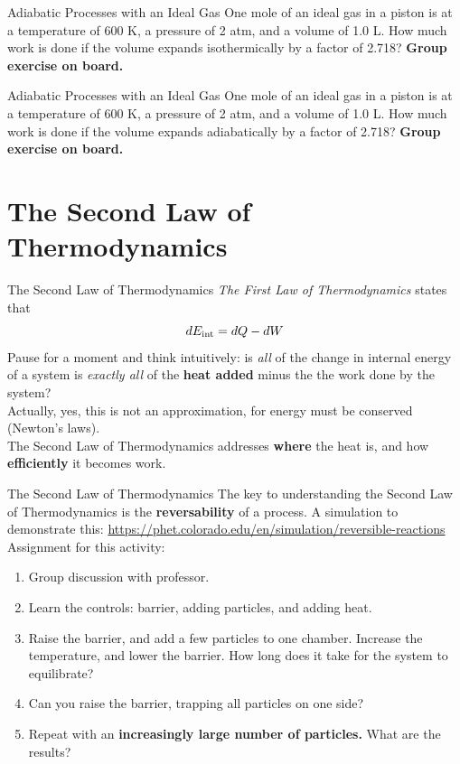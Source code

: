 \documentclass{beamer}
\begin{document}
\begin{frame}{Adiabatic Processes with an Ideal Gas}
One mole of an ideal gas in a piston is at a temperature of 600 K, a pressure of 2 atm, and a volume of 1.0 L.  How much work is done if the volume expands  \alert{isothermically} by a factor of 2.718?
\textbf{Group exercise on board.}
\end{frame}

\begin{frame}{Adiabatic Processes with an Ideal Gas}
One mole of an ideal gas in a piston is at a temperature of 600 K, a pressure of 2 atm, and a volume of 1.0 L.  How much work is done if the volume expands  \alert{adiabatically} by a factor of 2.718?
\textbf{Group exercise on board.}
\end{frame}

\section{The Second Law of Thermodynamics}

\begin{frame}{The Second Law of Thermodynamics}
\textit{The First Law of Thermodynamics} states that
\begin{equation}
dE_{\rm int} = dQ - dW
\end{equation}
Pause for a moment and think intuitively: is \textit{all} of the change in internal energy of a system is \textit{exactly all} of the \textbf{heat added} minus the the work done by the system? \\ \vspace{0.5cm}
Actually, yes, this is not an approximation, for energy must be conserved (Newton's laws). \\ \vspace{0.5cm}
\alert{The Second Law of Thermodynamics} addresses \textbf{where} the heat is, and how \textbf{efficiently} it becomes work.
\end{frame}

\begin{frame}{The Second Law of Thermodynamics}
\small
The key to understanding the \alert{Second Law of Thermodynamics} is the \textbf{reversability} of a process.  A simulation to demonstrate this:
\url{https://phet.colorado.edu/en/simulation/reversible-reactions} \\ \vspace{0.5cm}
Assignment for this activity:
\begin{enumerate}
\item Group discussion with professor.
\item Learn the controls: barrier, adding particles, and adding heat.
\item Raise the barrier, and add a few particles to one chamber.  Increase the temperature, and lower the barrier.  How long does it take for the system to equilibrate?
\item Can you raise the barrier, trapping all particles on one side?
\item Repeat with an \textbf{increasingly large number of particles.}  What are the results?
\end{enumerate}
\end{frame}
\end{document}

